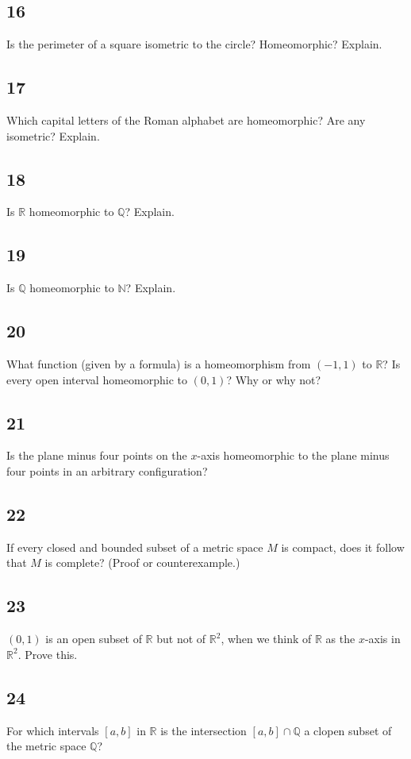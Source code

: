 \documentclass{amsart}
\begin{document}
\subsection*{16}
Is the perimeter of a square isometric to the circle? Homeomorphic? Explain.

\subsection*{17}
Which capital letters of the Roman alphabet are homeomorphic? Are any isometric? Explain.

\subsection*{18}
Is $\mathbb{R}$ homeomorphic to $\mathbb{Q}$? Explain.

\subsection*{19}
Is $\mathbb{Q}$ homeomorphic to $\mathbb{N}$? Explain.

\subsection*{20}
What function (given by a formula) is a homeomorphism from $(-1,1)$ to $\mathbb{R}$? Is every open interval homeomorphic to $(0,1)$? Why or why not?

\subsection*{21}
Is the plane minus four points on the $x$-axis homeomorphic to the plane minus four points in an arbitrary configuration?

\subsection*{22}
If every closed and bounded subset of a metric space $M$ is compact, does it follow that $M$ is complete? (Proof or counterexample.)

\subsection*{23}
$(0,1)$ is an open subset of $\mathbb{R}$ but not of $\mathbb{R}^2$, when we think of $\mathbb{R}$ as the $x$-axis in $\mathbb{R}^2$. Prove this.

\subsection*{24}
For which intervals $[a,b]$ in $\mathbb{R}$ is the intersection $[a,b] \cap \mathbb{Q}$ a clopen subset of the metric space $\mathbb{Q}$?
\end{document}
